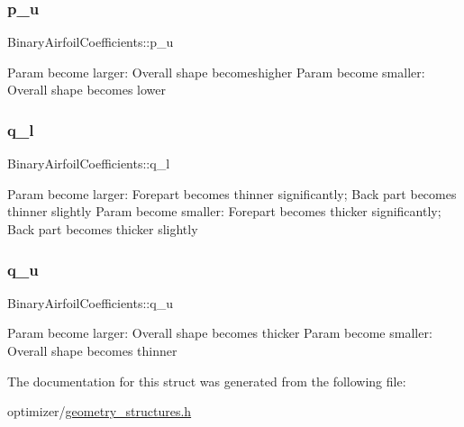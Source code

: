 \subsubsection{\texorpdfstring{p\+\_\+u}{p\_u}}
{\footnotesize\ttfamily Binary\+Airfoil\+Coefficients\+::p\+\_\+u}

Param become larger\+: Overall shape becomeshigher Param become smaller\+: Overall shape becomes lower \mbox{\label{struct_binary_airfoil_coefficients_af015cf807e794441f030791862b22adb}} 
\subsubsection{\texorpdfstring{q\+\_\+l}{q\_l}}
{\footnotesize\ttfamily Binary\+Airfoil\+Coefficients\+::q\+\_\+l}

Param become larger\+: Forepart becomes thinner significantly; Back part becomes thinner slightly Param become smaller\+: Forepart becomes thicker significantly; Back part becomes thicker slightly \mbox{\label{struct_binary_airfoil_coefficients_a6ed8c98c3817a396756b2a16a0d4791b}} 
\subsubsection{\texorpdfstring{q\+\_\+u}{q\_u}}
{\footnotesize\ttfamily Binary\+Airfoil\+Coefficients\+::q\+\_\+u}

Param become larger\+: Overall shape becomes thicker Param become smaller\+: Overall shape becomes thinner 

The documentation for this struct was generated from the following file\+:\begin{DoxyCompactItemize}
\item 
optimizer/\hyperlink{geometry__structures_8h}{geometry\+\_\+structures.\+h}\end{DoxyCompactItemize}
